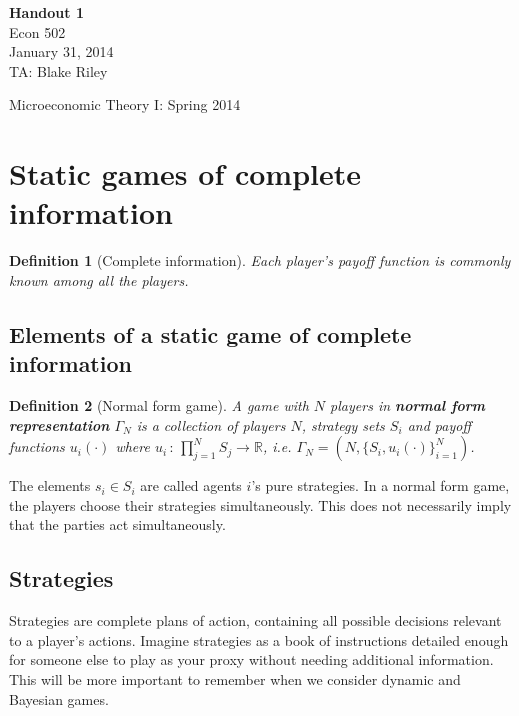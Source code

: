\documentclass[letter, 11pt]{article}
\theoremstyle{basic}
\newtheorem{definition}{Definition}[section]
\newcommand{\R}{\mathbb{R}}
\begin{document}
\begin{spacing}{1.0}

\noindent
\textbf{Handout 1} \\
Econ 502 \\
January 31, 2014 \\
TA: Blake Riley \\

\begin{center}
{\Large Microeconomic Theory I: Spring 2014}
\end{center}

\section{Static games of complete information}

\begin{definition}[Complete information]
  Each player's payoff function is commonly known among all the players.
\end{definition}

\subsection{Elements of a static game of complete
  information}

\begin{definition}[Normal form game]
  A game with $N$ players in \textbf{normal form
    representation} $\Gamma_N$ is a collection of players
    $N$, strategy sets $S_i$ and payoff functions
    $u_i(\cdot)$ where $u_i \,:\, \prod_{j=1}^N S_j \to
    \R$, i.e. $\Gamma_N = \left(N, \{S_i, u_i(\cdot)\}_{i=1}^N\right)$.
\end{definition}

The elements $s_i \in S_i$ are called agents $i$'s pure strategies. In a
normal form game, the players choose their strategies simultaneously. This
does not necessarily imply that the parties act simultaneously.

\subsection{Strategies}

Strategies are complete plans of action, containing all possible decisions
relevant to a player's actions. Imagine strategies as a book of
instructions detailed enough for someone else to play as your proxy without
needing additional information. This will be more important to remember
when we consider dynamic and Bayesian games.


\end{spacing}
\end{document}
